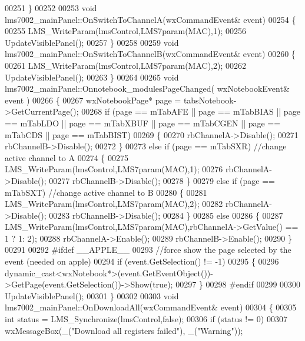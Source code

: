 \begin{DoxyCode}
00251 \}
00252 
00253 \textcolor{keywordtype}{void} lms7002_mainPanel::OnSwitchToChannelA(wxCommandEvent& event)
00254 \{
00255     LMS_WriteParam(lmsControl,LMS7param(MAC),1);
00256     UpdateVisiblePanel();
00257 \}
00258 
00259 \textcolor{keywordtype}{void} lms7002_mainPanel::OnSwitchToChannelB(wxCommandEvent& event)
00260 \{
00261     LMS_WriteParam(lmsControl,LMS7param(MAC),2);
00262     UpdateVisiblePanel();
00263 \}
00264 
00265 \textcolor{keywordtype}{void} lms7002_mainPanel::Onnotebook_modulesPageChanged( wxNotebookEvent& event )
00266 \{
00267     wxNotebookPage* page = tabsNotebook->GetCurrentPage();
00268     \textcolor{keywordflow}{if} (page == mTabAFE || page == mTabBIAS || page == mTabLDO || page == 
      mTabXBUF || page == mTabCGEN || page == mTabCDS || page == mTabBIST)
00269     \{
00270         rbChannelA->Disable();
00271         rbChannelB->Disable();
00272     \}
00273     \textcolor{keywordflow}{else} \textcolor{keywordflow}{if} (page == mTabSXR) \textcolor{comment}{//change active channel to A}
00274     \{
00275         LMS_WriteParam(lmsControl,LMS7param(MAC),1);
00276         rbChannelA->Disable();
00277         rbChannelB->Disable();
00278     \}
00279     \textcolor{keywordflow}{else} \textcolor{keywordflow}{if} (page == mTabSXT) \textcolor{comment}{//change active channel to B}
00280     \{
00281         LMS_WriteParam(lmsControl,LMS7param(MAC),2);
00282         rbChannelA->Disable();
00283         rbChannelB->Disable();
00284     \}
00285     \textcolor{keywordflow}{else}
00286     \{
00287         LMS_WriteParam(lmsControl,LMS7param(MAC),rbChannelA->GetValue() == 1 ? 1: 2);
00288         rbChannelA->Enable();
00289         rbChannelB->Enable();
00290     \}
00291 
00292 \textcolor{preprocessor}{#ifdef \_\_APPLE\_\_}
00293     \textcolor{comment}{//force show the page selected by the event (needed on apple)}
00294     \textcolor{keywordflow}{if} (event.GetSelection() != -1)
00295     \{
00296         \textcolor{keyword}{dynamic\_cast<}wxNotebook*\textcolor{keyword}{>}(\textcolor{keyword}{event}.GetEventObject())->GetPage(event.GetSelection())->Show(\textcolor{keyword}{true});
00297     \}
00298 \textcolor{preprocessor}{#endif}
00299 
00300     UpdateVisiblePanel();
00301 \}
00302 
00303 \textcolor{keywordtype}{void} lms7002_mainPanel::OnDownloadAll(wxCommandEvent& event)
00304 \{
00305     \textcolor{keywordtype}{int} status = LMS_Synchronize(lmsControl,\textcolor{keyword}{false});
00306     \textcolor{keywordflow}{if} (status != 0)
00307         wxMessageBox(\_(\textcolor{stringliteral}{"Download all registers failed"}), \_(\textcolor{stringliteral}{"Warning"}));

\end{DoxyCode}
